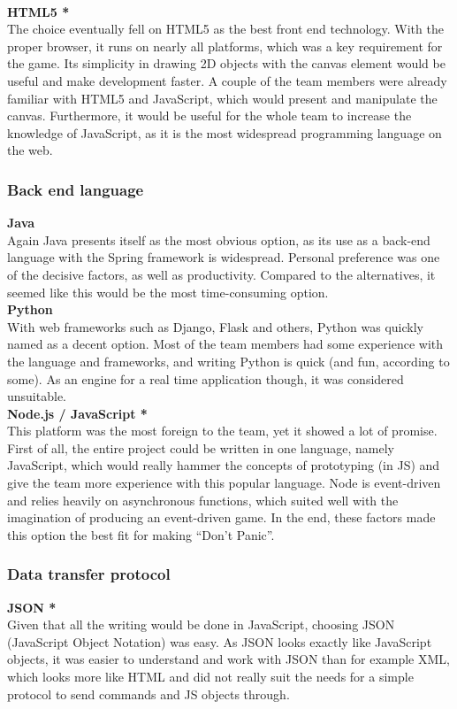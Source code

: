 \\ \newline
\textbf{HTML5 *}\\
The choice eventually fell on HTML5 as the best front end technology. With the proper browser, it runs on nearly all platforms, which was a key requirement for the game. Its simplicity in drawing 2D objects with the canvas element would be useful and make development faster. A couple of the team members were already familiar with HTML5 and JavaScript, which would present and manipulate the canvas. Furthermore, it would be useful for the whole team to increase the knowledge of JavaScript, as it is the most widespread programming language on the web.


\subsubsection{Back end language}
\textbf{Java}\\
Again Java presents itself as the most obvious option, as its use as a back-end language with the Spring framework is widespread. Personal preference was one of the decisive factors, as well as productivity. Compared to the alternatives, it seemed like this would be the most time-consuming option.
\\ \newline
\textbf{Python}\\
With web frameworks such as Django, Flask and others, Python was quickly named as a decent option. Most of the team members had some experience with the language and frameworks, and writing Python is quick (and fun, according to some). As an engine for a real time application though, it was considered unsuitable. 
\\ \newline
\textbf{Node.js / JavaScript *}\\
This platform was the most foreign to the team, yet it showed a lot of promise. First of all, the entire project could be written in one language, namely JavaScript, which would really hammer the concepts of prototyping (in JS) and give the team more experience with this popular language. Node is event-driven and relies heavily on asynchronous functions, which suited well with the imagination of producing an event-driven game. In the end, these factors made this option the best fit for making “Don’t Panic”.


\subsubsection{Data transfer protocol}
\textbf{JSON *}\\
Given that all the writing would be done in JavaScript, choosing JSON (JavaScript Object Notation) was easy. As JSON looks exactly like JavaScript objects, it was easier to understand and work with JSON than for example XML, which looks more like HTML and did not really suit the needs for a simple protocol to send commands and JS objects through.


